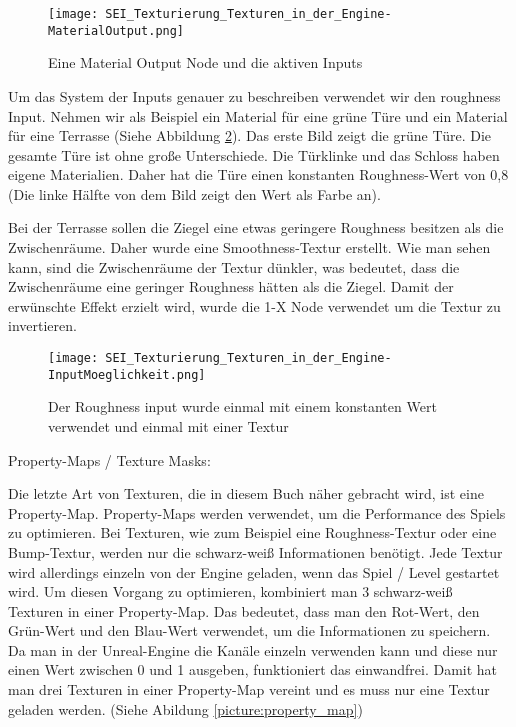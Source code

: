 \begin{figure}[H]
    \centering
    \texttt{[image: SEI\_Texturierung\_Texturen\_in\_der\_Engine-MaterialOutput.png]}
    \caption{Eine Material Output Node und die aktiven Inputs}
    \label{picture:mat_ue4_node}
\end{figure}


Um das System der Inputs genauer zu beschreiben verwendet wir den roughness Input. Nehmen wir als Beispiel ein Material
für eine grüne Türe und ein Material für eine Terrasse (Siehe Abbildung \ref{picture:tex_mat_roughness}).
Das erste Bild zeigt die grüne Türe. Die gesamte Türe ist ohne große Unterschiede. Die Türklinke und das Schloss haben
eigene Materialien. Daher hat die Türe einen konstanten Roughness-Wert von 0,8 (Die linke Hälfte von dem Bild zeigt
den Wert als Farbe an).

Bei der Terrasse sollen die Ziegel eine etwas geringere Roughness besitzen als die Zwischenräume. Daher wurde eine
Smoothness-Textur erstellt. Wie man sehen kann, sind die Zwischenräume der Textur dünkler, was bedeutet, dass die
Zwischenräume eine geringer Roughness hätten als die Ziegel. Damit der erwünschte Effekt erzielt wird, wurde die
1-X Node verwendet um die Textur zu invertieren.

\begin{figure}[H]
    \centering
    \texttt{[image: SEI\_Texturierung\_Texturen\_in\_der\_Engine-InputMoeglichkeit.png]}
    \caption{Der Roughness input wurde einmal mit einem konstanten Wert verwendet und einmal mit einer Textur}
    \label{picture:tex_mat_roughness}
\end{figure}


Property-Maps / Texture Masks\citep{ue:tex_property_map}:

Die letzte Art von Texturen, die in diesem Buch näher gebracht wird, ist eine Property-Map. Property-Maps werden
verwendet, um die Performance des Spiels zu optimieren. Bei Texturen, wie zum Beispiel eine Roughness-Textur oder eine
Bump-Textur, werden nur die schwarz-weiß Informationen benötigt. Jede Textur wird allerdings einzeln von der Engine
geladen, wenn das Spiel / Level gestartet wird. Um diesen Vorgang zu optimieren, kombiniert man 3 schwarz-weiß Texturen
in einer Property-Map. Das bedeutet, dass man den Rot-Wert, den Grün-Wert und den Blau-Wert verwendet, um die
Informationen zu speichern. Da man in der Unreal-Engine die Kanäle einzeln verwenden kann und diese nur einen Wert
zwischen 0 und 1 ausgeben, funktioniert das einwandfrei. Damit hat man drei Texturen in einer
Property-Map vereint und es muss nur eine Textur geladen werden. (Siehe Abildung \ref{picture:property_map})

